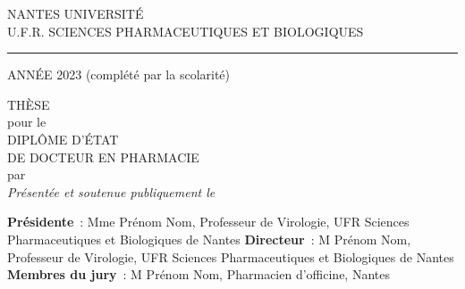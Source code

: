 \begin{center}
    NANTES UNIVERSITÉ\\
    \vspace{0.3cm}U.F.R. SCIENCES PHARMACEUTIQUES ET BIOLOGIQUES\\
    \vspace{0.5cm}\hrule
\end{center}


ANNÉE 2023 \hfill \No(complété par la scolarité)

\begin{center}
\vspace{2cm}
THÈSE\\
pour le\\
DIPLÔME D'ÉTAT\\
DE DOCTEUR EN PHARMACIE\\
\vspace{2cm}
par\\
\theauthor
\vspace{0.5cm}
\vspace{0.1cm}
\emph{Présentée et soutenue publiquement le \thedate}\\
\end{center}

\begin{boxed}
    \begin{center}
        \vspace{2cm}
        \thetitle
        \vspace{2cm}
    \end{center}
\end{boxed}

\vfill

\textbf{Présidente}~: Mme Prénom Nom, Professeur de Virologie, UFR Sciences Pharmaceutiques et Biologiques de Nantes\newline
\textbf{Directeur}~: M Prénom Nom, Professeur de Virologie, UFR Sciences Pharmaceutiques et Biologiques de Nantes\newline
\textbf{Membres du jury}~: M Prénom Nom, Pharmacien d'officine, Nantes
